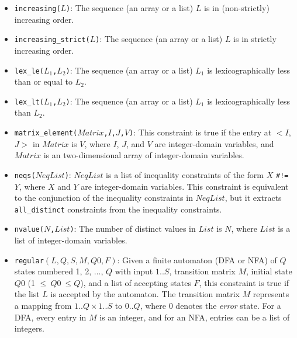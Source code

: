 \begin{itemize}
\item \texttt{increasing($L$)}: The sequence (an array or a list) $L$ is in (non-strictly) increasing order.

\item \texttt{increasing\_strict($L$)}: The sequence (an array or a list) $L$ is in strictly increasing order.

\item \texttt{lex\_le($L_1$,$L_2$)}: The sequence (an array or a list) $L_1$ is lexicographically less than or equal to $L_2$.

\item \texttt{lex\_lt($L_1$,$L_2$)}: The sequence (an array or a list) $L_1$ is lexicographically less than $L_2$.

\item \texttt{matrix\_element($Matrix$,$I$,$J$,$V$)}: This constraint is true if the entry at $<$$I$,$J$$>$ in $Matrix$ is $V$, where $I$, $J$, and $V$ are integer-domain variables, and $Matrix$ is an two-dimensional array of integer-domain variables.

\item \texttt{neqs($NeqList$)}: $NeqList$ is a list of inequality constraints of the form $X$ \verb+#!=+ $Y$, where $X$ and $Y$ are integer-domain variables. This constraint is equivalent to the conjunction of the inequality constraints in $NeqList$, but it extracts \texttt{all\_distinct} constraints from the inequality constraints. 

\item \texttt{nvalue($N$,$List$)}: The number of distinct values in $List$ is $N$, where $List$ is a list of integer-domain variables.

\item \texttt{regular$(L, Q, S, M, Q0, F)$}:  Given a finite automaton (DFA or NFA) of $Q$ states numbered 1, 2, $\ldots$, $Q$ with input $1..S$, transition matrix $M$, initial state $Q0$ (1 $\le\ Q0\ \le Q$), and a list of accepting states $F$, this constraint is true if the list $L$ is accepted by the automaton. The transition matrix $M$ represents a mapping from $1..Q\times 1..S$ to $0..Q$, where $0$ denotes the {\it error} state.  For a DFA, every entry in $M$ is an integer, and for an NFA, entries can be a list of integers.


\end{itemize}
